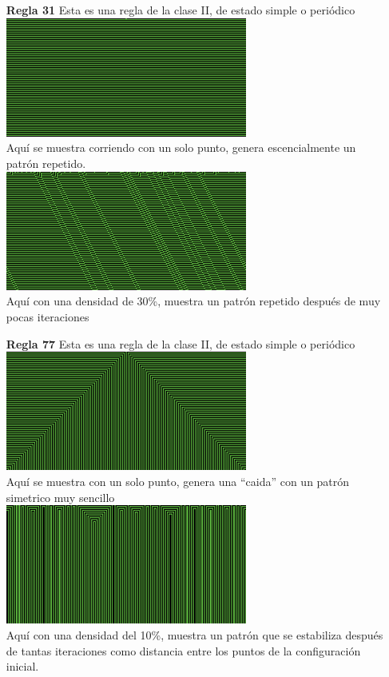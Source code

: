 \documentclass{article}
\begin{document}
\begin{enumerate}
\item[\bf{Regla 31}] Esta es una regla de la clase II, de estado simple o periódico\\ 
\includegraphics[width=300px]{31-1.png}\\
Aquí se muestra corriendo con un solo punto, genera escencialmente un patrón repetido.\\
\includegraphics[width=300px]{31-30.png}\\
Aquí con una densidad de 30\%, muestra un patrón repetido después de muy pocas iteraciones\\

\item[\bf{Regla 77}] Esta es una regla de la clase II, de estado simple o periódico\\ 
\includegraphics[width=300px]{77-1.png}\\
Aquí se muestra con un solo punto, genera una ``caida'' con un patrón simetrico muy sencillo\\
\includegraphics[width=300px]{77-10.png}\\
Aquí con una densidad del 10\%, muestra un patrón que se estabiliza después de tantas iteraciones como distancia entre los puntos de la configuración inicial.\\


\end{enumerate}
\end{document}

